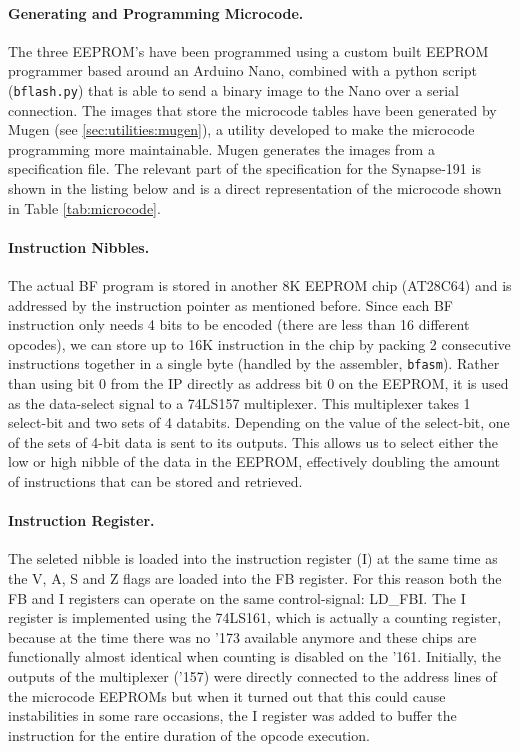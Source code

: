 \paragraph{Generating and Programming Microcode.} The three EEPROM's have been programmed using a custom built EEPROM programmer based around an Arduino Nano, combined with a python script (\texttt{bflash.py}) that is able to send a binary image to the Nano over a serial connection. The images that store the microcode tables have been generated by Mugen (see \ref{sec:utilities:mugen}), a utility developed to make the microcode programming more maintainable. Mugen generates the images from a specification file. The relevant part of the specification for the Synapse-191 is shown in the listing below and is a direct representation of the microcode shown in Table \ref{tab:microcode}.

\newpage



\paragraph{Instruction Nibbles.} The actual BF program is stored in another 8K EEPROM chip (AT28C64) and is addressed by the instruction pointer as mentioned before. Since each BF instruction only needs 4 bits to be encoded (there are less than 16 different opcodes), we can store up to 16K instruction in the chip by packing 2 consecutive instructions together in a single byte (handled by the assembler, \texttt{bfasm}). Rather than using bit 0 from the IP directly as address bit 0 on the EEPROM, it is used as the data-select signal to a 74LS157 multiplexer. This multiplexer takes 1 select-bit and two sets of 4 databits. Depending on the value of the select-bit, one of the sets of 4-bit data is sent to its outputs. This allows us to select either the low or high nibble of the data in the EEPROM, effectively doubling the amount of instructions that can be stored and retrieved.

\paragraph{Instruction Register.} The seleted nibble is loaded into the instruction register (I) at the same time as the V, A, S and Z flags are loaded into the FB register. For this reason both the FB and I registers can operate on the same control-signal: LD\_FBI. The I register is implemented using the 74LS161, which is actually a counting register, because at the time there was no '173 available anymore and these chips are functionally almost identical when counting is disabled on the '161. Initially, the outputs of the multiplexer ('157) were directly connected to the address lines of the microcode EEPROMs but when it turned out that this could cause instabilities in some rare occasions, the I register was added to buffer the instruction for the entire duration of the opcode execution.
 
